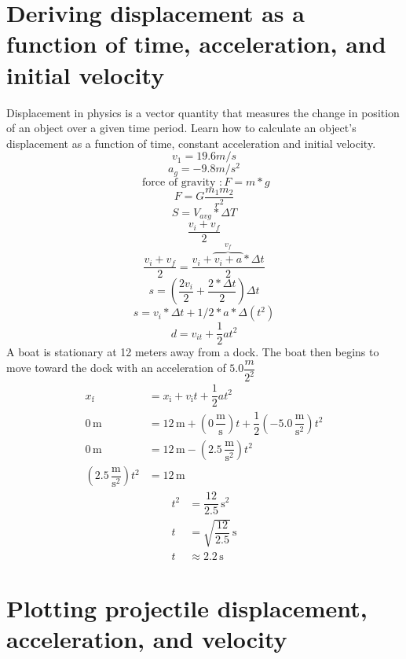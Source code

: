 \documentclass{article}
\theoremstyle{mytheoremstyle}
\theoremstyle{mytheoremstyle}
\theoremstyle{myproblemstyle}
\begin{document}
\section{Deriving displacement as a function of time, acceleration, and initial velocity}
Displacement in physics is a vector quantity that measures the change in position of an object over a given time period. Learn how to calculate an object’s displacement as a function of time, constant acceleration and initial velocity.
\[
v_1 = 19.6m/s
\]
\[
a_g = -9.8m/s^2
\]
\[
\text{ force of gravity }: F = m*g
\]
\[
F = G\dfrac{m_1m_2}{r^2}
\]
\[
S = V_{avg} * \Delta{T}
\]
\[
\dfrac{v_i+v_f}{2}
\]
\[
\dfrac{v_i+v_f}{2} = \dfrac{v_i + \overbrace{v_i + a}^{v_f}*{\Delta{t}}}{2}
\]
\[
s=(\dfrac{2v_i}{2}+\dfrac{2*\Delta{t}}{2})\Delta{t}
\]
\[
s = v_i*\Delta{t}+1/2*a*\Delta(t^2)
\]
\[
d = v_{it}+\dfrac{1}{2}at^2
\]
A boat is stationary at 12 meters away from a dock. The boat then begins to move toward the dock with an acceleration of $5.0\dfrac{m}{2^2}$
\[
\begin{aligned}
x_{\text{f}} & = x_{\text{i}} + v_{\text{i}}t + \dfrac{1}{2}at^2 \\
0\, \text{m} & = 12\, \text{m} + (0\, \dfrac{\text{m}}{\text{s}})t + \dfrac{1}{2}(-5.0\, \dfrac{\text{m}}{\text{s}^2})t^2 \\
0\, \text{m} & = 12\, \text{m} - (2.5\, \dfrac{\text{m}}{\text{s}^2})t^2 \\
(2.5\, \dfrac{\text{m}}{\text{s}^2})t^2 & = 12\, \text{m}
\end{aligned}
\]
\[
\begin{aligned}
t^2 & = \dfrac{12}{2.5}\, \text{s}^2 \\
t   & = \sqrt{\dfrac{12}{2.5}}\, \text{s} \\
t   & \approx 2.2\, \text{s}
\end{aligned}
\]

\section{Plotting projectile displacement, acceleration, and velocity}
\end{document}
